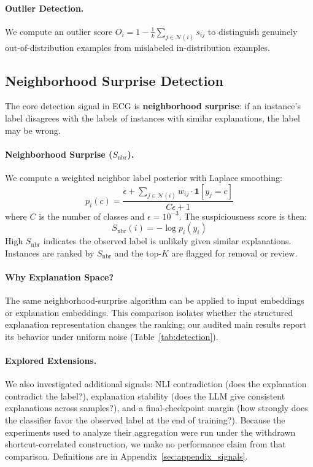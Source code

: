 \documentclass[letterpaper]{article}
\newcommand{\Snbr}{S_{\text{nbr}}}
\begin{document}
\paragraph{Outlier Detection.}
We compute an outlier score $O_i = 1 - \frac{1}{k}\sum_{j \in \mathcal{N}(i)} s_{ij}$ to distinguish genuinely out-of-distribution examples from mislabeled in-distribution examples.

\subsection{Neighborhood Surprise Detection}
\label{sec:signals}

The core detection signal in ECG is \textbf{neighborhood surprise}: if an instance's label disagrees with the labels of instances with similar explanations, the label may be wrong.

\paragraph{Neighborhood Surprise ($\Snbr$).}
We compute a weighted neighbor label posterior with Laplace smoothing:
\begin{equation}
    p_i(c) = \frac{\epsilon + \sum_{j \in \mathcal{N}(i)} w_{ij} \cdot \mathbf{1}[y_j = c]}{C\epsilon + 1}
\end{equation}
where $C$ is the number of classes and $\epsilon=10^{-3}$.
The suspiciousness score is then:
\begin{equation}
    \Snbr(i) = -\log p_i(y_i)
\end{equation}
High $\Snbr$ indicates the observed label is unlikely given similar explanations.
Instances are ranked by $\Snbr$ and the top-$K$ are flagged for removal or review.

\paragraph{Why Explanation Space?}
The same neighborhood-surprise algorithm can be applied to input embeddings or explanation embeddings.
This comparison isolates whether the structured explanation representation changes the ranking; our audited main results report its behavior under uniform noise (Table~\ref{tab:detection}).

\paragraph{Explored Extensions.}
We also investigated additional signals: NLI contradiction (does the explanation contradict the label?), explanation stability (does the LLM give consistent explanations across samples?), and a final-checkpoint margin (how strongly does the classifier favor the observed label at the end of training?).
Because the experiments used to analyze their aggregation were run under the withdrawn shortcut-correlated construction, we make no performance claim from that comparison.
Definitions are in Appendix~\ref{sec:appendix_signals}.
\end{document}
